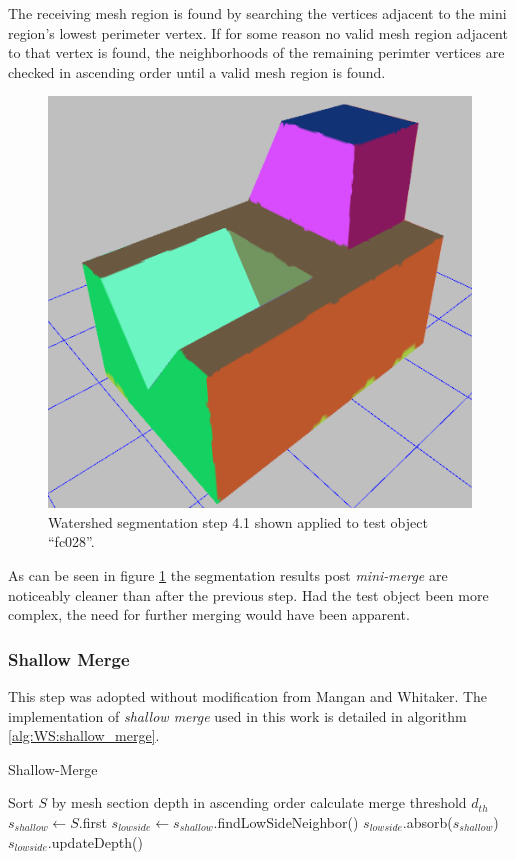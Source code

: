 The receiving mesh region is found by searching the vertices adjacent to the mini region's lowest perimeter vertex.
If for some reason no valid mesh region adjacent to that vertex is found, the neighborhoods of the remaining perimter vertices are checked in ascending order until a valid mesh region is found.

\begin{figure}[htb]
	\centering
	\includegraphics[width=0.5\linewidth]{../resources/watershed/fc028_WS4.1.png}
\caption{
Watershed segmentation step 4.1 shown applied to test object ``fc028''.
}
	\label{fig:ws_4.1}
\end{figure}

As can be seen in figure \ref{fig:ws_4.1} the segmentation results post \textit{mini-merge} are noticeably cleaner than after the previous step.
Had the test object been more complex, the need for further merging would have been apparent.

\subsubsection{Shallow Merge}
This step was adopted without modification from Mangan and Whitaker.
The implementation of \textit{shallow merge} used in this work is detailed in algorithm \ref{alg:WS:shallow_merge}.

\begin{algorithm}[!b]
\caption{Shallow-Merge}\label{alg:WS:shallow_merge}
\begin{algorithmic}[1]
		\State Sort $S$ by mesh section depth in ascending order
		\State calculate merge threshold $d_{th}$
			\State $s_{shallow} \leftarrow S$.first
			\State $s_{lowside} \leftarrow s_{shallow}$.findLowSideNeighbor()
			\State $s_{lowside}$.absorb($s_{shallow}$)
			\State $s_{lowside}$.updateDepth()
		\EndWhile
	\EndFunction
\end{algorithmic}
\end{algorithm}

